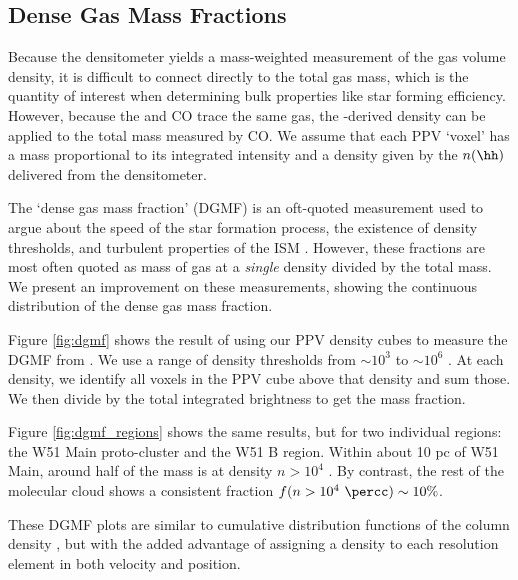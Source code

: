 \subsection{Dense Gas Mass Fractions}
Because the \formaldehyde densitometer yields a mass-weighted measurement of
the gas volume density, it is difficult to connect directly to the total gas
mass, which is the quantity of interest when determining bulk properties like
star forming efficiency.  However, because the \formaldehyde and CO trace the
same gas, the \formaldehyde-derived density can be applied to the total mass
measured by CO.  We assume that each \thirteenco PPV `voxel' has a mass
proportional to its integrated intensity and a density given by the $n(\hh)$
delivered from the \formaldehyde densitometer.

The `dense gas mass fraction' (DGMF) is an oft-quoted measurement used to argue
about the speed of the star formation process, the existence of density
thresholds, and turbulent properties of the ISM \citep[e.g. Fig. 5
of][]{Krumholz2007a,Battisti2014a,Kainulainen2013a,Juneau2009a,Muraoka2009a,Hopkins2013e}.
However, these fractions are most often quoted as mass of gas at a \emph{single}
density divided by the total mass.  We present an improvement on these measurements,
showing the continuous distribution of the dense gas mass fraction.

Figure \ref{fig:dgmf} shows the result of using our \formaldehyde PPV density
cubes to measure the DGMF from \thirteenco.  We use a range of density
thresholds from $\sim10^3$ to $\sim10^6$ \percc.  At each density, we identify
all voxels in the \thirteenco PPV cube above that density and sum those.  We
then divide by the total integrated \thirteenco brightness to get the mass
fraction. 

Figure \ref{fig:dgmf_regions} shows the same results, but for two individual
regions: the W51 Main proto-cluster and the W51 B region.  Within about 10 pc
of W51 Main, around half of the mass is at density $n>10^4$ \percc.  By
contrast, the rest of the molecular cloud shows a consistent fraction
$f(n>10^4~\percc) \sim10\%$.

These DGMF plots are similar to cumulative distribution functions of the column
density \citep[e.g.][Figure 6]{Battersby2014a}, but with the added advantage of
assigning a density to each resolution element in both velocity and position.

